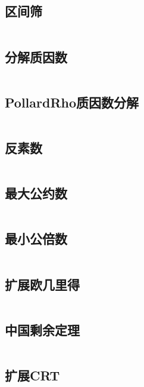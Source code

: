 \subsection{	区间筛} 

\inputminted{cpp}{code/区间筛.cc}

\subsection{分解质因数} 

\inputminted{cpp}{code/factorization.cc}

\subsection{PollardRho质因数分解} 

\inputminted{cpp}{code/pollard_rho质因数分解.cc}

\subsection{	反素数} 

\inputminted{cpp}{code/反素数.cc}

\subsection{最大公约数} 

\inputminted{cpp}{code/gcd.cc}

\subsection{最小公倍数} 

\inputminted{cpp}{code/lcm.cc}

\subsection{扩展欧几里得} 

\inputminted{cpp}{code/exGcd.cc}

\subsection{中国剩余定理} 

\inputminted{cpp}{code/crt.cc}

\subsection{扩展CRT} 

